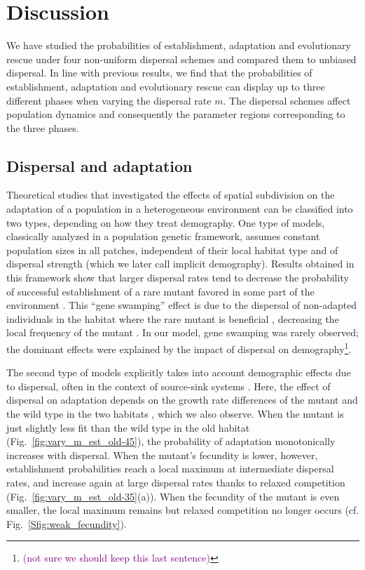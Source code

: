 \documentclass[11pt]{article}
\newcommand{\florence}[1]{\textcolor{purple}{(#1)}} %
\begin{document}
\section*{Discussion}
%
We have studied the probabilities of establishment, adaptation and evolutionary rescue under four non-uniform dispersal schemes and compared them to unbiased dispersal. In line with previous results, we find that the probabilities of establishment, adaptation and evolutionary rescue can display up to three different phases when varying the dispersal rate $m$. The dispersal schemes affect population dynamics and consequently the parameter regions corresponding to the three phases.

\subsection*{Dispersal and adaptation}
Theoretical studies that investigated the effects of spatial subdivision on the adaptation of a population in a heterogeneous environment can be classified into two types, depending on how they treat demography. One type of models, classically analyzed in a population genetic framework, assumes constant population sizes in all patches, independent of their local habitat type and of dispersal strength (which we later call implicit demography). Results obtained in this framework show that larger dispersal rates tend to decrease the probability of successful establishment of a rare mutant favored in some part of the environment \citep[e.g.][]{garcia_1997}. This ``gene swamping'' effect is due to the dispersal of non-adapted individuals in the habitat where the rare mutant is beneficial , decreasing the local frequency of the mutant \citep{lenormand_2002,tomasini_2018}. In our model, gene swamping was rarely observed; the dominant effects were explained by the impact of dispersal on demography\footnote{\florence{not sure we should keep this last sentence}}. 

The second type of models explicitly takes into account demographic effects due to dispersal, often in the context of source-sink systems \citep{holt_1985, pulliam_1988}. 
Here, the effect of dispersal on adaptation depends on the growth rate differences of the mutant and the wild type in the two habitats \citep{kawecki_2000}, which we also observe. When the mutant is just slightly less fit than the wild type in the old habitat (Fig.~\ref{fig:vary_m_est_old-45}), the probability of adaptation monotonically increases with dispersal. When the mutant's fecundity is lower, however, establishment probabilities reach a local maximum at intermediate dispersal rates, and increase again at large dispersal rates thanks to relaxed competition (Fig.~\ref{fig:vary_m_est_old-35}(a)). When the fecundity of the mutant is even smaller, the local maximum remains but relaxed competition no longer occurs (cf. Fig.~\ref{Sfig:weak_fecundity}). 
\end{document}
